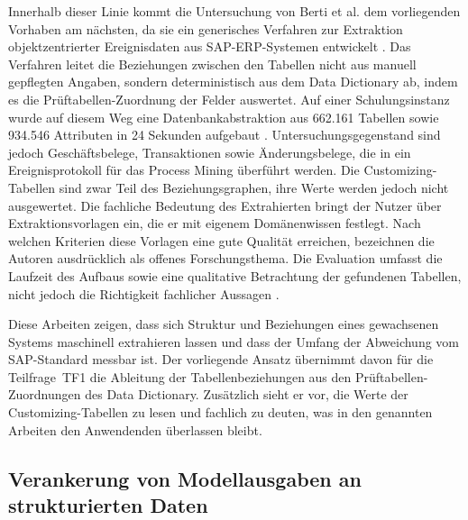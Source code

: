 Innerhalb dieser Linie kommt die Untersuchung von Berti et al. dem vorliegenden Vorhaben am nächsten, da sie ein generisches Verfahren zur Extraktion objektzentrierter Ereignisdaten aus SAP-ERP-Systemen entwickelt \cite{berti_generic_2023}. Das Verfahren leitet die Beziehungen zwischen den Tabellen nicht aus manuell gepflegten Angaben, sondern deterministisch aus dem Data Dictionary ab, indem es die Prüftabellen-Zuordnung der Felder auswertet. Auf einer Schulungsinstanz wurde auf diesem Weg eine Datenbankabstraktion aus 662.161 Tabellen sowie 934.546 Attributen in 24 Sekunden aufgebaut \cite{berti_generic_2023}. Untersuchungsgegenstand sind jedoch Geschäftsbelege, Transaktionen sowie Änderungsbelege, die in ein Ereignisprotokoll für das Process Mining überführt werden. Die Customizing-Tabellen sind zwar Teil des Beziehungsgraphen, ihre Werte werden jedoch nicht ausgewertet. Die fachliche Bedeutung des Extrahierten bringt der Nutzer über Extraktionsvorlagen ein, die er mit eigenem Domänenwissen festlegt. Nach welchen Kriterien diese Vorlagen eine gute Qualität erreichen, bezeichnen die Autoren ausdrücklich als offenes Forschungsthema. Die Evaluation umfasst die Laufzeit des Aufbaus sowie eine qualitative Betrachtung der gefundenen Tabellen, nicht jedoch die Richtigkeit fachlicher Aussagen \cite{berti_generic_2023}.

Diese Arbeiten zeigen, dass sich Struktur und Beziehungen eines gewachsenen Systems maschinell extrahieren lassen und dass der Umfang der Abweichung vom SAP-Standard messbar ist. Der vorliegende Ansatz übernimmt davon für die Teilfrage~TF1 die Ableitung der Tabellenbeziehungen aus den Prüftabellen-Zuordnungen des Data Dictionary. Zusätzlich sieht er vor, die Werte der Customizing-Tabellen zu lesen und fachlich zu deuten, was in den genannten Arbeiten den Anwendenden überlassen bleibt.

\subsection{Verankerung von Modellausgaben an strukturierten Daten}
\label{subsec:rw-schema}

